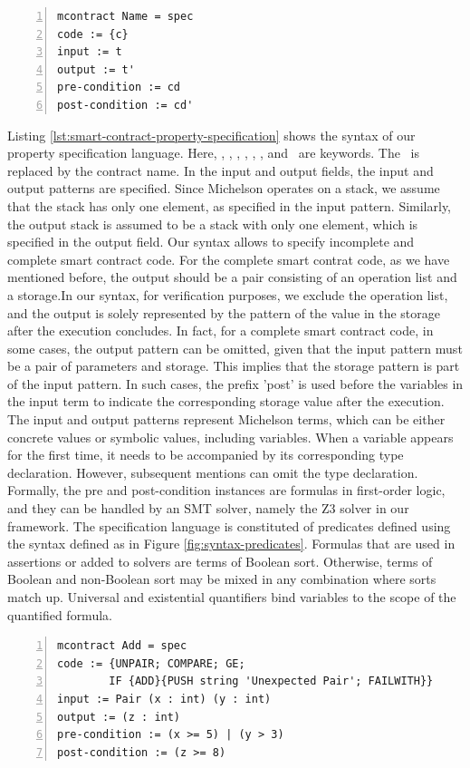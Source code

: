 \documentclass[a4paper,UKenglish,cleveref, autoref, thm-restate]{lipics-v2021}
\begin{document}
\begin{lstlisting}[float,captionpos=b,caption={Smart contract property specification},label={lst:smart-contract-property-specification},numbers=left]
mcontract Name = spec
code := {c}
input := t
output := t'
pre-condition := cd
post-condition := cd'
\end{lstlisting}
Listing \ref{lst:smart-contract-property-specification} shows the syntax of our property specification language. Here, \KMCONTRACT, \KWITH, \KCODE, \KINPUT, \KOUTPUT, \KPRECONDI, and \KPOSTCONDI\ are keywords. The \KNAME\ is replaced by the contract name. In the input and output fields, the input and output patterns are specified. Since Michelson operates on a stack, we assume that the stack has only one element, as specified in the input pattern. Similarly, the output stack is assumed to be a stack with only one element, which is specified in the output field. Our syntax allows to specify incomplete and complete smart contract code. For the complete smart contrat code, as we have mentioned before, the output should be a pair consisting of an operation list and a storage.In our syntax, for verification purposes, we exclude the operation list, and the output is solely represented by the pattern of the value in the storage after the execution concludes. In fact, for a complete smart contract code, in some cases, the output pattern can be omitted, given that the input pattern must be a pair of parameters and storage. This implies that the storage pattern is part of the input pattern. In such cases, the prefix 'post' is used before the variables in the input term to indicate the corresponding storage value after the execution.  The input and output patterns represent Michelson terms, which can be either concrete values or symbolic values, including variables. When a variable appears for the first time, it needs to be accompanied by its corresponding type declaration. However, subsequent mentions can omit the type declaration. Formally, the pre and post-condition instances are formulas in first-order logic, and they can be handled by an SMT solver, namely the Z3 solver in our framework. The specification language is constituted of predicates defined using the syntax defined as in Figure \ref{fig:syntax-predicates}. Formulas that are used in assertions or added to solvers are terms of Boolean sort. Otherwise, terms of Boolean and non-Boolean sort may be mixed in any combination where sorts match up. Universal and existential quantifiers bind variables to the scope of the quantified formula.
\begin{lstlisting}[float,captionpos=b,caption={The specification of Add contracr},label={lst:add-contract-specification},numbers=left]
mcontract Add = spec
code := {UNPAIR; COMPARE; GE; 
        IF {ADD}{PUSH string 'Unexpected Pair'; FAILWITH}}
input := Pair (x : int) (y : int)
output := (z : int)
pre-condition := (x >= 5) | (y > 3)
post-condition := (z >= 8)
\end{lstlisting}
\end{document}
